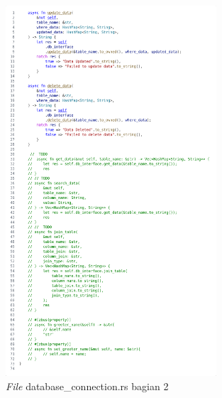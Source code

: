 \begin{figure}[H]
  \centering{}
	\includegraphics[width=0.7\textwidth]{gambar/lampiran/file-database-connection-2.png}
  \caption{\emph{File} database\_connection.rs bagian 2}
\end{figure}

